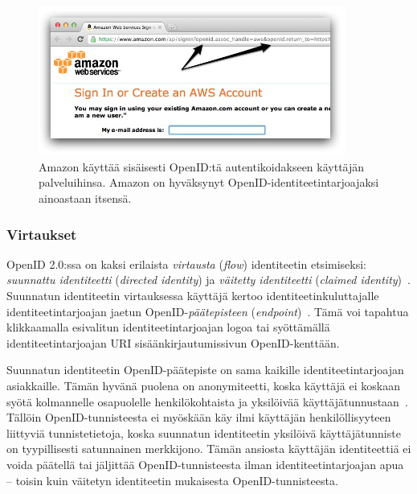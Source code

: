 \documentclass[finnish,gradu]{tktltiki}
\begin{document}
  \begin{figure}
    \centering
    \includegraphics[width=0.9\textwidth]{images/amazon_openid.jpg}
    \caption[Amazon soveltaa OpenID:tä.]{Amazon käyttää sisäisesti OpenID:tä autentikoidakseen käyttäjän palveluihinsa. Amazon on hyväksynyt  OpenID-identiteetintarjoajaksi ainoastaan itsensä.}
    \label{fig:amazon_openid}
  \end{figure}


  \subsubsection{Virtaukset} %
  \label{ssub:openid_virtaukset}

  OpenID 2.0:ssa on kaksi erilaista \emph{virtausta} (\emph{flow}) identiteetin etsimiseksi: \emph{suunnattu identiteetti}  (\emph{directed identity}) ja \emph{väitetty identiteetti} (\emph{claimed identity})~\cite{hueniverse_openid_idps}. Suunnatun identiteetin virtauksessa käyttäjä kertoo identiteetinkuluttajalle identiteetintarjoajan jaetun OpenID-\emph{päätepisteen} (\emph{endpoint})~\cite{openid_discovery_recordon_2008}. Tämä voi tapahtua klikkaamalla esivalitun identiteetintarjoajan logoa tai syöttämällä identiteetintarjoajan URI sisäänkirjautumissivun OpenID-kenttään.

  Suunnatun identiteetin OpenID-päätepiste on sama kaikille identiteetintarjoajan asiakkaille. Tämän hyvänä puolena on anonymiteetti, koska käyttäjä ei koskaan syötä kolmannelle osapuolelle henkilökohtaista ja yksilöivää käyttäjätunnustaan~\cite{google_best_practices_authentication}. Tällöin OpenID-tunnisteesta ei myöskään käy ilmi käyttäjän henkilöllisyyteen liittyviä tunnistetietoja, koska suunnatun identiteetin yksilöivä käyttäjätunniste on tyypillisesti satunnainen merkkijono. Tämän ansiosta käyttäjän identiteettiä ei voida päätellä tai jäljittää OpenID-tunnisteesta ilman identiteetintarjoajan apua -- toisin kuin väitetyn identiteetin mukaisesta OpenID-tunnisteesta.
\end{document}

